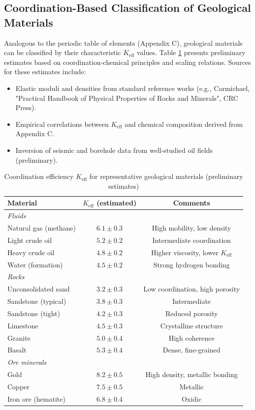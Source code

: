 \documentclass[12pt,a4paper]{article}
\theoremstyle{remark}
\newcommand{\Keff}{K_{\mathrm{eff}}}
\begin{document}
	\subsection{Coordination-Based Classification of Geological Materials}
	
	Analogous to the periodic table of elements (Appendix C), geological materials can be classified by their characteristic $\Keff$ values. Table \ref{tab:keff-geology} presents preliminary estimates based on coordination-chemical principles and scaling relations. Sources for these estimates include:
	\begin{itemize}
		\item Elastic moduli and densities from standard reference works (e.g., Carmichael, "Practical Handbook of Physical Properties of Rocks and Minerals", CRC Press).
		\item Empirical correlations between $\Keff$ and chemical composition derived from Appendix C.
		\item Inversion of seismic and borehole data from well-studied oil fields (preliminary).
	\end{itemize}
	
	\begin{table}[htbp]
		\centering
		\caption{Coordination efficiency $\Keff$ for representative geological materials (preliminary estimates)}
		\label{tab:keff-geology}
		\small
		\begin{tabular}{lcc}
			\toprule
			\textbf{Material} & \textbf{$\Keff$ (estimated)} & \textbf{Comments} \\
			\midrule
			\multicolumn{3}{l}{\textit{Fluids}} \\
			Natural gas (methane) & $6.1 \pm 0.3$ & High mobility, low density \\
			Light crude oil & $5.2 \pm 0.2$ & Intermediate coordination \\
			Heavy crude oil & $4.8 \pm 0.2$ & Higher viscosity, lower $\Keff$ \\
			Water (formation) & $4.5 \pm 0.2$ & Strong hydrogen bonding \\
			\hline
			\multicolumn{3}{l}{\textit{Rocks}} \\
			Unconsolidated sand & $3.2 \pm 0.3$ & Low coordination, high porosity \\
			Sandstone (typical) & $3.8 \pm 0.3$ & Intermediate \\
			Sandstone (tight) & $4.2 \pm 0.3$ & Reduced porosity \\
			Limestone & $4.5 \pm 0.3$ & Crystalline structure \\
			Granite & $5.0 \pm 0.4$ & High coherence \\
			Basalt & $5.3 \pm 0.4$ & Dense, fine-grained \\
			\hline
			\multicolumn{3}{l}{\textit{Ore minerals}} \\
			Gold & $8.2 \pm 0.5$ & High density, metallic bonding \\
			Copper & $7.5 \pm 0.5$ & Metallic \\
			Iron ore (hematite) & $6.8 \pm 0.4$ & Oxidic \\
			\bottomrule
		\end{tabular}
	\end{table}
	
\end{document}
